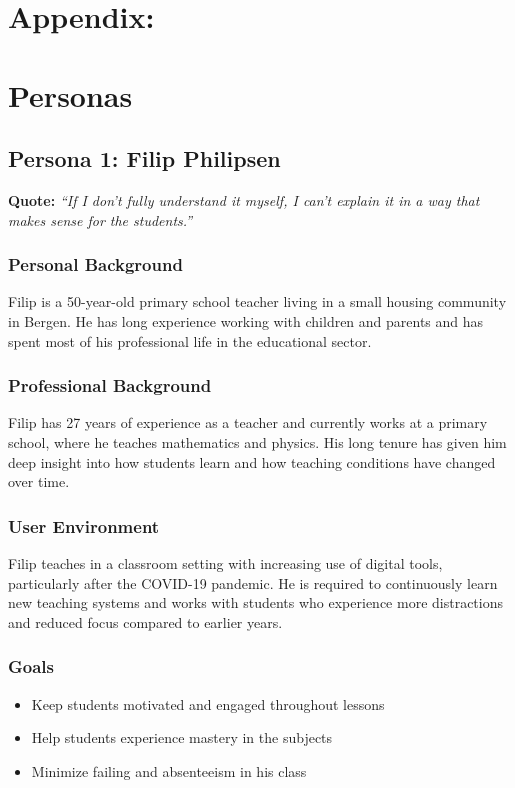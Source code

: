 \appendix

\section*{Appendix:}

\section{Personas}

\subsection{Persona 1: Filip Philipsen}

\textbf{Quote:}  
\emph{“If I don’t fully understand it myself, I can’t explain it in a way that makes sense for the students.”}

\subsubsection{Personal Background}
Filip is a 50-year-old primary school teacher living in a small housing community in Bergen.
He has long experience working with children and parents and has spent most of his professional life in the educational sector.

\subsubsection{Professional Background}
Filip has 27 years of experience as a teacher and currently works at a primary school, where he teaches mathematics and physics.
His long tenure has given him deep insight into how students learn and how teaching conditions have changed over time.

\subsubsection{User Environment}
Filip teaches in a classroom setting with increasing use of digital tools, particularly after the COVID-19 pandemic.
He is required to continuously learn new teaching systems and works with students who experience more distractions
and reduced focus compared to earlier years.

\subsubsection{Goals}
\begin{itemize}
    \item Keep students motivated and engaged throughout lessons
    \item Help students experience mastery in the subjects
    \item Minimize failing and absenteeism in his class
\end{itemize}

